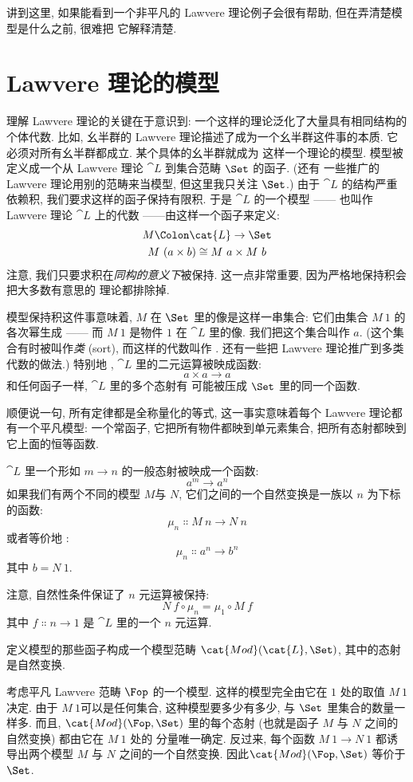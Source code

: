 讲到这里, 如果能看到一个非平凡的 Lawvere 理论例子会很有帮助, 但在弄清楚模型是什么之前, 很难把
它解释清楚.

\section{Lawvere 理论的模型}

理解 Lawvere 理论的关键在于意识到: 一个这样的理论泛化了大量具有相同结构的个体代数. 比如, 幺半群的
Lawvere 理论描述了成为一个幺半群这件事的本质. 它必须对所有幺半群都成立. 某个具体的幺半群就成为
这样一个理论的模型. 模型被定义成一个从 Lawvere 理论 $\cat{L}$ 到集合范畴 $\Set$ 的函子. (还有
一些推广的 Lawvere 理论用别的范畴来当模型, 但这里我只关注 $\Set$.) 由于 $\cat{L}$ 的结构严重依赖积,
我们要求这样的函子保持有限积. 于是 $\cat{L}$ 的一个模型 —— 也叫作 Lawvere 理论 $\cat{L}$ 上的代数
——由这样一个函子来定义:
\begin{gather*}
  M \Colon \cat{L} \to \Set \\
  M\ (a \times b) \cong M\ a \times M\ b
\end{gather*}
注意, 我们只要求积在\emph{同构的意义下}被保持. 这一点非常重要, 因为严格地保持积会把大多数有意思的
理论都排除掉.

模型保持积这件事意味着, $M$ 在 $\Set$ 里的像是这样一串集合: 它们由集合 $M\ 1$ 的各次幂生成 —— 而
$M\ 1$ 是物件 $1$ 在 $\cat{L}$ 里的像. 我们把这个集合叫作 $a$. (这个集合有时被叫作\emph{类} (sort),
而这样的代数叫作 . 还有一些把 Lawvere 理论推广到多类代数的做法.) 特别地
,
$\cat{L}$ 里的二元运算被映成函数: \[a \times a \to a\] 和任何函子一样, $\cat{L}$ 里的多个态射有
可能被压成 $\Set$ 里的同一个函数.

顺便说一句, 所有定律都是全称量化的等式, 这一事实意味着每个 Lawvere 理论都有一个平凡模型: 一个常函子,
它把所有物件都映到单元素集合, 把所有态射都映到它上面的恒等函数.

$\cat{L}$ 里一个形如 $m \to n$ 的一般态射被映成一个函数: \[a^m \to a^n\] 如果我们有两个不同的模型
$M$与 $N$, 它们之间的一个自然变换是一族以 $n$ 为下标的函数: \[\mu_n \Colon M\ n \to N\ n\] 或者等价地
:
\[\mu_n \Colon a^n \to b^n\] 其中 $b = N\ 1$.

注意, 自然性条件保证了 $n$ 元运算被保持: \[N\ f \circ \mu_n = \mu_1 \circ M\ f\] 其中
$f \Colon n \to 1$ 是 $\cat{L}$ 里的一个 $n$ 元运算.

定义模型的那些函子构成一个模型范畴 $\cat{Mod}(\cat{L}, \Set)$, 其中的态射是自然变换.

考虑平凡 Lawvere 范畴 $\Fop$ 的一个模型. 这样的模型完全由它在 $1$ 处的取值 $M\ 1$ 决定. 由于
$M\ 1$可以是任何集合, 这种模型要多少有多少, 与 $\Set$ 里集合的数量一样多. 而且,
$\cat{Mod}(\Fop, \Set)$ 里的每个态射 (也就是函子 $M$ 与 $N$ 之间的自然变换) 都由它在 $M\ 1$ 处的
分量唯一确定. 反过来, 每个函数 $M\ 1 \to N\ 1$ 都诱导出两个模型 $M$ 与 $N$ 之间的一个自然变换.
因此$\cat{Mod}(\Fop, \Set)$ 等价于 $\Set$.

